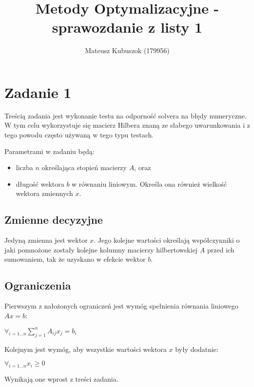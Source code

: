 \documentclass[polish,12pt,titlepage]{article}
\begin{document}
\title{Metody Optymalizacyjne - sprawozdanie z listy 1}
\author{Mateusz Kubuszok (179956)}
\maketitle

\section{Zadanie 1}

Treścią zadania jest wykonanie testu na odporność solvera na błędy numeryczne. W tym celu wykorzystuje się macierz Hilbera znaną ze słabego uwarunkowania i z tego powodu często używaną w tego typu testach.

Parametrami w zadaniu będą:
\begin{itemize}
    \item liczba $n$ określająca stopień macierzy $A$, oraz
    \item długość wektora $b$ w równaniu liniowym. Określa ona również wielkość wektora zmiennych $x$.
\end{itemize} 

\subsection{Zmienne decyzyjne}

Jedyną zmienna jest wektor $x$. Jego kolejne wartości określają współczynniki o jaki pomnożone zostały kolejne kolumny macierzy hilbertowskiej $A$ przed ich sumowaniem, tak że uzyskano w efekcie wektor $b$.

\subsection{Ograniczenia}

Pierwszym z nałożonych ograniczeń jest wymóg spełnienia równania liniowego $Ax = b$:

\begin{center}
$\forall_{i = 1...n} \sum\limits_{j=1}^n A_{ij}x_{j} = b_{i}$
\end{center}

Kolejnym jest wymóg, aby wszystkie wartości wektora $x$ były dodatnie:

\begin{center}
$\forall_{i = 1...n}{x_i \geq 0}$
\end{center}

Wynikają one wprost z treści zadania.
\end{document}
